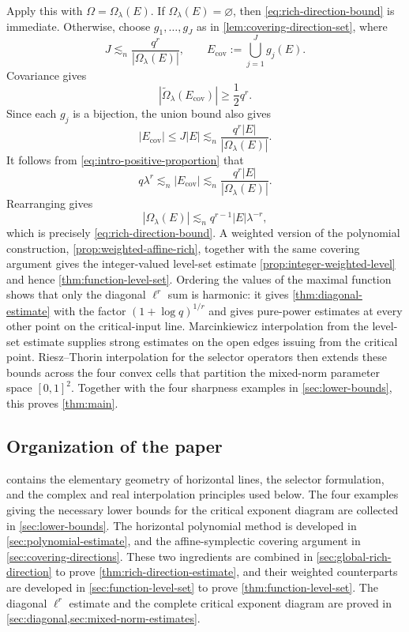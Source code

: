\documentclass[11pt,letterpaper]{amsart}
\numberwithin{equation}{section}
\theoremstyle{definition}
\theoremstyle{remark}
\begin{document}
Apply this with $\Omega=\Omega_\lambda(E)$.  If
$\Omega_\lambda(E)=\varnothing$, then \eqref{eq:rich-direction-bound} is
immediate.  Otherwise, choose $g_1,\ldots,g_J$ as in
\cref{lem:covering-direction-set}, where
\[
 J\lesssim_n\frac{q^r}{|\Omega_\lambda(E)|},
 \qquad
 E_{\mathrm{cov}}:=\bigcup_{j=1}^Jg_j(E).
\]
Covariance gives
\[
 |\widetilde\Omega_\lambda(E_{\mathrm{cov}})|
 \geq \frac12q^r.
\]
Since each $g_j$ is a bijection, the union bound also gives
\[
 |E_{\mathrm{cov}}|
 \leq J|E|
 \lesssim_n
 \frac{q^r|E|}{|\Omega_\lambda(E)|}.
\]
It follows from \eqref{eq:intro-positive-proportion} that
\[
 q\lambda^r
 \lesssim_n
 |E_{\mathrm{cov}}|
 \lesssim_n
 \frac{q^r|E|}{|\Omega_\lambda(E)|}.
\]
Rearranging gives
\[
 |\Omega_\lambda(E)|
 \lesssim_n
 q^{r-1}|E|\lambda^{-r},
\]
which is precisely \eqref{eq:rich-direction-bound}.
A weighted version of the polynomial construction,
\cref{prop:weighted-affine-rich}, together with the same covering
argument gives the integer-valued level-set estimate
\cref{prop:integer-weighted-level} and hence
\cref{thm:function-level-set}. Ordering the values of the
maximal function shows that only the diagonal $\ell^r$ sum is harmonic:
it gives \cref{thm:diagonal-estimate} with the factor
$(1+\log q)^{1/r}$ and gives pure-power estimates at every other point on the critical-input line. Marcinkiewicz interpolation from the
level-set estimate supplies strong estimates on the open edges issuing from the critical point. Riesz--Thorin interpolation for the selector operators then extends these bounds across the four convex cells that partition the mixed-norm parameter space $[0, 1]^2$. Together with the four sharpness examples in \cref{sec:lower-bounds}, this proves \cref{thm:main}.



\subsection{Organization of the paper}

 contains the elementary geometry of horizontal lines, the selector formulation, and the complex and real
interpolation principles used below.
The four examples giving the necessary lower bounds for the critical exponent diagram are collected in \cref{sec:lower-bounds}.
The horizontal polynomial method is developed in \cref{sec:polynomial-estimate}, and the affine-symplectic covering
argument in \cref{sec:covering-directions}. These two ingredients are combined in \cref{sec:global-rich-direction} to prove
\cref{thm:rich-direction-estimate}, and their weighted counterparts are developed in \cref{sec:function-level-set} to prove
\cref{thm:function-level-set}. The diagonal $\ell^r$ estimate and the complete critical exponent diagram are proved in
\cref{sec:diagonal,sec:mixed-norm-estimates}. 
\end{document}
